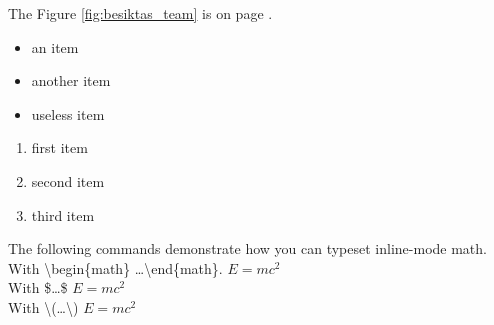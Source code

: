     The Figure \ref{fig:besiktas_team} is on page \pageref{fig:besiktas_team}.

    \clearpage

    \begin{itemize}
        \item an item
        \item another item
        \item useless item
    \end{itemize}
    
    \begin{enumerate}
        \item first item
        \item second item
        \item third item
    \end{enumerate}


    The following commands demonstrate how you can typeset inline-mode math.\\
    With \textbackslash begin\{math\} \dots \textbackslash end\{math\}.
    \begin{math}
        E=mc^2
    \end{math}
    \\
    With \$\dots\$
    $E=mc^2$
    \\
    With \textbackslash (\dots\textbackslash)
    \(E=mc^2\)

